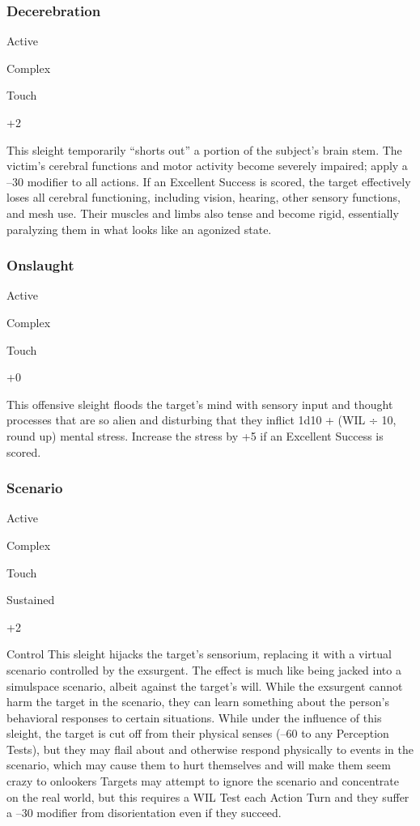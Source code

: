 \subsubsection{Decerebration }


  

Active

   Complex

 Touch

  

   +2

  
This sleight temporarily ``shorts out'' a portion of the 
subject's brain stem. The victim's cerebral functions 
and motor activity become severely impaired; apply 
a –30 modifier to all actions. If an Excellent Success
is scored, the target effectively loses all cerebral
functioning, including vision, hearing, other sensory 
functions, and mesh use. Their muscles and limbs also 
tense and become rigid, essentially paralyzing them in 
what looks like an agonized state.

\subsubsection{Onslaught}


  

Active

   Complex

 Touch

  

   +0

  
This offensive sleight floods the target's mind with 
sensory input and thought processes that are so alien 
and disturbing that they inflict 1d10 + (WIL ÷ 10, 
round up) mental stress. Increase the stress by +5 if an 
Excellent Success is scored.

\subsubsection{Scenario }


  

Active

   Complex

 Touch

   Sustained

   +2

  

Control
This sleight hijacks the target's sensorium, replacing 
it with a virtual scenario controlled by the exsurgent. 
The effect is much like being jacked into a simulspace 
scenario, albeit against the target's will. While the 
exsurgent cannot harm the target in the scenario, they 
can learn something about the person's behavioral 
responses to certain situations. While under the influence
of this sleight, the target is cut off from their
physical senses (–60 to any Perception Tests), but they 
may flail about and otherwise respond physically to 
events in the scenario, which may cause them to hurt 
themselves and will make them seem crazy to onlookers
Targets may attempt to ignore the scenario and
concentrate on the real world, but this requires a WIL 
Test each Action Turn and they suffer a –30 modifier 
from disorientation even if they succeed. 

